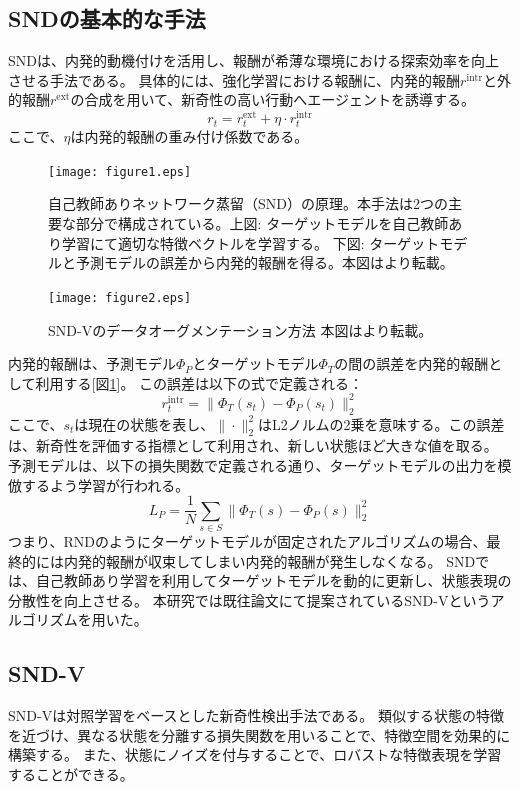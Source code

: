 \subsection{SNDの基本的な手法}
SNDは、内発的動機付けを活用し、報酬が希薄な環境における探索効率を向上させる手法である。
具体的には、強化学習における報酬に、内発的報酬\(r^{\text{intr}}\)と外的報酬\(r^{\text{ext}}\)の合成を用いて、新奇性の高い行動へエージェントを誘導する。
\[
 r_t = r^{\text{ext}}_{t} + \eta \cdot r^{\text{intr}}_{t}
\]
ここで、\(\eta\)は内発的報酬の重み付け係数である。
\begin{figure}[t]
   \centering
   \texttt{[image: figure1.eps]}
   \caption{自己教師ありネットワーク蒸留（SND）の原理。本手法は2つの主要な部分で構成されている。上図: ターゲットモデルを自己教師あり学習にて適切な特徴ベクトルを学習する。 下図: ターゲットモデルと予測モデルの誤差から内発的報酬を得る。本図は\cite{SND}より転載。}\label{fig1:figure1}
\end{figure}
\begin{figure}[t]
   \centering
   \texttt{[image: figure2.eps]}
   \caption{SND-Vのデータオーグメンテーション方法 本図は\cite{SND}より転載。}\label{fig2:figure2}
\end{figure}


内発的報酬は、予測モデル\(\Phi_P\)とターゲットモデル\(\Phi_T\)の間の誤差を内発的報酬として利用する[図\ref{fig1:figure1}]。
この誤差は以下の式で定義される：
\[
 r^{\text{intr}}_{t} = \| \Phi_T(s_t) - \Phi_P(s_t) \|_2^2
\]
ここで、\(s_t\)は現在の状態を表し、\(\|\cdot\|_2^2\)はL2ノルムの2乗を意味する。この誤差は、新奇性を評価する指標として利用され、新しい状態ほど大きな値を取る。
予測モデルは、以下の損失関数で定義される通り、ターゲットモデルの出力を模倣するよう学習が行われる。
\[
 L_P = \frac{1}{N} \sum_{s \in S} \| \Phi_T(s) - \Phi_P(s) \|_2^2
\]
つまり、RNDのようにターゲットモデルが固定されたアルゴリズムの場合、最終的には内発的報酬が収束してしまい内発的報酬が発生しなくなる。
SNDでは、自己教師あり学習を利用してターゲットモデルを動的に更新し、状態表現の分散性を向上させる。
本研究では既往論文にて提案されているSND-Vというアルゴリズムを用いた。

\subsection{SND-V}
SND-Vは対照学習をベースとした新奇性検出手法である。
類似する状態の特徴を近づけ、異なる状態を分離する損失関数を用いることで、特徴空間を効果的に構築する。
また、状態にノイズを付与することで、ロバストな特徴表現を学習することができる。

